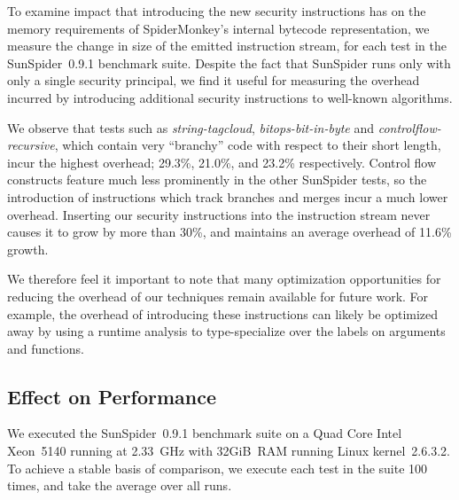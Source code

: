 \documentclass[preprint]{sigplanconf}
\begin{document}
To examine impact that introducing the new security instructions has on the memory requirements of SpiderMonkey's internal bytecode representation, we measure the change in size of the emitted instruction stream, for each test in the SunSpider~0.9.1 benchmark suite.
Despite the fact that SunSpider runs only with only a single security principal, we find it useful for measuring the overhead incurred by introducing additional security instructions to well-known algorithms.

We observe that tests such as \textit{string-tagcloud}, \textit{bitops-bit-in-byte} and \textit{controlflow-recursive}, which contain very ``branchy'' code with respect to their short length, incur the highest overhead; 29.3\%, 21.0\%, and 23.2\% respectively.
Control flow constructs feature much less prominently in the other SunSpider tests, so the introduction of instructions which track branches and merges incur a much lower overhead.
Inserting our security instructions into the instruction stream never causes it to grow by more than 30\%, and maintains an average overhead of 11.6\% growth.

We therefore feel it important to note that many optimization opportunities for reducing the overhead of our techniques remain available for future work.
For example, the overhead of introducing these instructions can likely be optimized away by using a runtime analysis to type-specialize over the labels on arguments and functions.

\subsection{Effect on Performance}
\label{sec:evaluation-performance}

We executed the SunSpider~0.9.1 benchmark suite on a Quad Core Intel Xeon~5140 running at 2.33~GHz with 32GiB~RAM running Linux kernel~2.6.3.2.
To achieve a stable basis of comparison, we execute each test in the suite 100 times, and take the average over all runs.
\end{document}
